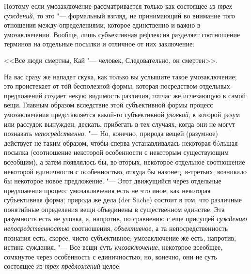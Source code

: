 {{Поэтому если умозаключение рассматривается только как
состоящее {\em из трех суждений},
то это "--- формальный взгляд, не принимающий во
внимание того отношения между определениями, которое единственно и важно в
умозаключении. Вообще, лишь субъективная рефлексия разделяет соотношение
терминов на отдельные посылки и отличное от них заключение:

<<Все люди смертны,
Кай "--- человек,
Следовательно, он смертен>>.

На вас сразу же нападет скука, как только вы услышите такое
умозаключение; это проистекает от той бесполезной формы, которая
посредством отдельных предложений создает некую видимость различия, тотчас
же исчезающую в самой вещи. Главным образом вследствие этой субъективной
формы процесс умозаключения представляется какой-то субъективной
{\em уловкой}, к которой
разум или рассудок вынужден, дескать, прибегать в тех случаях, когда они не
могут познавать {\em непосредственно}.
"--- Но, конечно, природа вещей (разумное) действует не таким
образом, чтобы сперва устанавливалась некоторая бóльшая посылка
(соотношение некоторой особенности с некоторым существующим всеобщим), а
затем появлялось бы, во-вторых, некоторое отдельное соотношение некоторой
единичности с особенностью, откуда бы наконец, в-третьих, возникало бы
некоторое новое предложение. "--- \label{bkm:bm52a}Этот
движущийся через отдельные предложения процесс умозаключения есть не что
иное, как некоторая субъективная форма; природа же дела (der Sache) состоит
в том, что различные понятийные определения вещи объединены в существенном
единстве. Эта разумность есть не уловка, а, напротив, по сравнению с еще
присущей {\em суждению
непосредственностью} соотношения,
{\em объективное}, а та
непосредственность познания есть, скорее, чисто субъективное; умозаключение
же есть, напротив, истина суждения. "--- Все вещи суть
{\em умозаключение},
некоторое всеобщее, сомкнутое через особенность с
единичностью; но, конечно, они не суть состоящее из
{\em трех предложений}
целое.

}}
